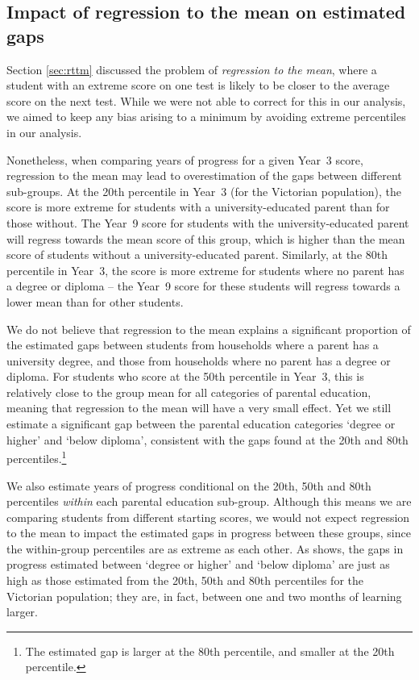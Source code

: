 \newpage
\subsection{Impact of regression to the mean on estimated gaps} \label{sec:reg_mean_gaps}

Section \ref{sec:rttm} discussed the problem of \textit{regression to the mean}, where a student with an extreme score on one test is likely to be closer to the average score on the next test. While we were not able to correct for this in our analysis, we aimed to keep any bias arising to a minimum by avoiding extreme percentiles in our analysis.

Nonetheless, when comparing years of progress for a given \mbox{Year 3} score, regression to the mean may lead to overestimation of the gaps between different sub-groups. At the 20th percentile in \mbox{Year 3} (for the Victorian population), the score is more extreme for students with a university-educated parent than for those without. The \mbox{Year 9} score for students with the university-educated parent will regress towards the mean score of this group, which is higher than the mean score of students without a university-educated parent. Similarly, at the 80th percentile in \mbox{Year 3}, the score is more extreme for students where no parent has a degree or diploma -- the \mbox{Year 9} score for these students will regress towards a lower mean than for other students.

\newpage
We do not believe that regression to the mean explains a significant proportion of the estimated gaps between students from households where a parent has a university degree, and those from households where no parent has a degree or diploma. For students who score at the 50th percentile in \mbox{Year 3}, this is relatively close to the group mean for all categories of parental education, meaning that regression to the mean will have a very small effect. Yet we still estimate a significant gap between the parental education categories `degree or higher' and `below diploma', consistent with the gaps found at the 20th and 80th percentiles.\footnote{The estimated gap is larger at the 80th percentile, and smaller at the 20th percentile.}

We also estimate years of progress conditional on the 20th, 50th and 80th percentiles \textit{within} each parental education sub-group. Although this means we are comparing students from different starting scores, we would not expect regression to the mean to impact the estimated gaps in progress between these groups, since the within-group percentiles are as extreme as each other. As  shows, the gaps in progress estimated between `degree or higher' and `below diploma' are just as high as those estimated from the 20th, 50th and 80th percentiles for the Victorian population; they are, in fact, between one and two months of learning larger.

